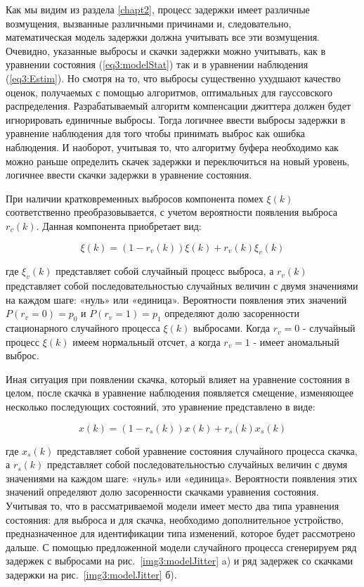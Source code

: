 Как мы видим из раздела \ref{chapt2}, процесс задержки имеет различные возмущения, вызванные различными причинами и, следовательно, математическая модель задержки должна учитывать все эти возмущения.
Очевидно, указанные выбросы и скачки задержки можно учитывать, как в уравнении состояния (\ref{eq3:modelStat}) так и в уравнении наблюдения (\ref{eq3:Estim}). Но смотря на то, что выбросы существенно ухудшают качество оценок, получаемых с помощью алгоритмов, оптимальных для гауссовского распределения. Разрабатываемый алгоритм компенсации джиттера должен будет игнорировать единичные выбросы. Тогда логичнее ввести выбросы задержки в уравнение наблюдения для того чтобы принимать выброс как ошибка наблюдения. И наоборот, учитывая то, что алгоритму буфера необходимо как можно раньше определить скачек задержки и переключиться на новый уровень, логичнее ввести скачки задержки в уравнение состояния.

При наличии кратковременных выбросов компонента помех $\xi(k)$ соответственно преобразовывается, с учетом вероятности появления выброса $r_v(k)$. Данная компонента приобретает вид:

\begin{equation}\label{eq3:v}
\xi(k)=(1-r_v(k))\xi(k)+r_v(k)\xi_v(k)
\end{equation}

\noindent где $\xi_v(k)$ представляет собой случайный процесс выброса, а $r_v(k)$ представляет собой последовательностью случайных величин с двумя значениями на каждом шаге: «нуль» или «единица». Вероятности появления этих значений $P(r_v=0)=p_0$ и $P(r_v=1)=p_1$ определяют долю засоренности стационарного случайного процесса $\xi(k)$ выбросами. Когда $r_v=0$ - случайный процесс  $\xi(k)$ имеем нормальный отсчет, а когда $r_v=1$ - имеет аномальный выброс.

Иная ситуация при появлении скачка, который влияет на уравнение состояния в целом, после скачка в уравнение наблюдения появляется смещение, изменяющее несколько последующих состояний, это уравнение представлено в виде:

\begin{equation}\label{eq3:s}
x(k)=(1-r_s(k))x(k)+r_s(k)x_s(k)
\end{equation}

\noindent где $x_s(k)$ представляет собой уравнение состояния случайного процесса скачка, а $r_s(k)$ представляет собой последовательностью случайных величин с двумя значениями на каждом шаге: «нуль» или «единица». Вероятности появления этих значений определяют долю засоренности скачками уравнения состояния. 
Учитывая то, что в рассматриваемой модели имеет место два типа уравнения состояния: для выброса и для скачка, необходимо дополнительное устройство, предназначенное для идентификации типа изменений, которое будет рассмотрено дальше.
С помощью предложенной модели случайного процесса сгенерируем ряд задержек с выбросами на рис. \ref{img3:modelJitter} a) и ряд задержек со скачками задержки на рис. \ref{img3:modelJitter} б).

